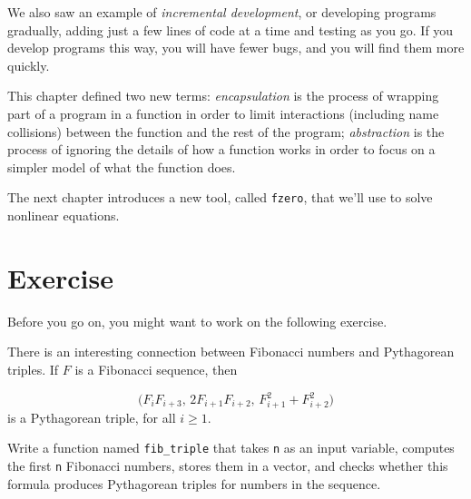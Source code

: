 \documentclass[../../book.tex]{subfiles}
\begin{document}
We also saw an example of \emph{incremental development}, or developing programs gradually, adding just a few lines of code at a time and testing as you go.  If you develop programs this way, you will have fewer bugs, and you will find them more quickly.

This chapter defined two new terms: \emph{encapsulation} is the process of wrapping part of a program in
a function in order to limit interactions (including name collisions)
between the function and the rest of the program; \emph{abstraction} is the process of ignoring the details of how a function works in order to focus on a simpler model of what the
function does.

The next chapter introduces a new tool, called \lstinline{fzero}, that we'll use to solve nonlinear equations.


\section{Exercise}

Before you go on, you might want to work on the following exercise.

\begin{ex}

There is an interesting connection between Fibonacci numbers and
Pythagorean triples.  If $F$ is a Fibonacci sequence, then

\begin{equation*}
\big(F_i F_{i+3}, \, 2 F_{i+1} F_{i+2}, \, F_{i+1}^2 + F_{i+2}^2 \big)
\end{equation*}
is a Pythagorean triple, for all $i \ge 1$.

Write a function named \lstinline{fib_triple} that
takes \lstinline{n} as an input variable, computes
the first \lstinline{n} Fibonacci numbers, stores them in a vector,
and checks whether this formula produces Pythagorean triples for numbers in the \mbox{sequence}.


\end{ex}
\end{document}

